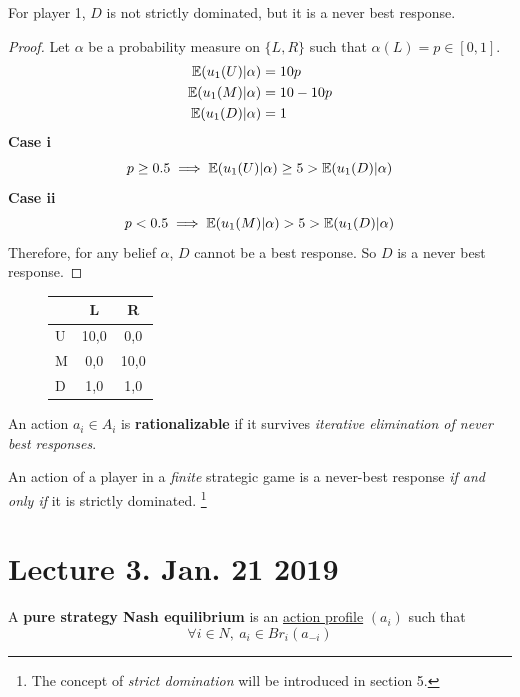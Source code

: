 \documentclass[11pt]{article}
\begin{document}
			\begin{example}
				For player 1, $D$ is not strictly dominated, but it is a never best response.
				\begin{proof}
					Let $\alpha$ be a probability measure on $\{L, R\}$ such that $\alpha(L) = p \in [0, 1]$.\\
					\begin{align}
						\mathbb{E}({u_1(U)|\alpha}) &= 10p \\
						\mathbb{E}({u_1(M)|\alpha}) &= 10 - 10p \\
						\mathbb{E}({u_1(D)|\alpha}) &= 1
					\end{align}
					\textbf{Case i}
					\begin{equation}
						p \geq 0.5 \implies \mathbb{E}({u_1(U)|\alpha}) \geq 5 > \mathbb{E}({u_1(D)|\alpha})
					\end{equation}
					\textbf{Case ii}
					\begin{equation}
						p < 0.5 \implies \mathbb{E}({u_1(M)|\alpha}) > 5 > \mathbb{E}({u_1(D)|\alpha})
					\end{equation}
					Therefore, for any belief $\alpha$, $D$ cannot be a best response. So $D$ is a never best response.
				\end{proof}
			\end{example}
			\begin{figure}[h]
				\centering
				\begin{tabular}{l|cc}
				  & L & R\\
				  \hline
				  U & 10,0 & 0,0 \\
				  M & 0,0 & 10,0\\
				  D & 1,0 & 1,0
				\end{tabular}
			\end{figure}
			
			\begin{definition}
				An action $a_i \in A_i$ is \textbf{rationalizable} if it survives \emph{iterative elimination of never best responses}.
			\end{definition}
			
			\begin{lemma}[60.1]
				An action of a player in a \emph{finite} strategic game is a never-best response \emph{if and only if} it is strictly dominated. \footnote{The concept of \emph{strict domination} will be introduced in section 5.}
			\end{lemma}
		
	\section{Lecture 3. Jan. 21 2019}
		\begin{definition}
			A \textbf{pure strategy Nash equilibrium} is an \ul{action profile} $(a_i)$ such that 
			\begin{equation}
				\forall i \in N,\ a_i \in Br_i(a_{-i})
			\end{equation}
		\end{definition}
			
\end{document}
